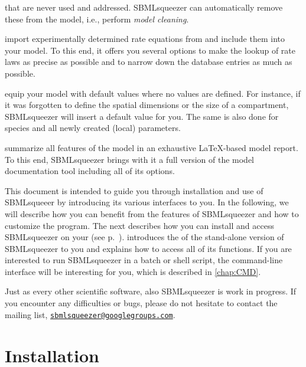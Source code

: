 \begin{dinglist}{52}
  that are never used and addressed. SBMLsqueezer can automatically remove these from
  the model, i.e., perform \emph{model cleaning}.
\item import experimentally determined rate equations from \SABIO and include them into
  your model. To this end, it offers you several options to make the lookup of rate laws
  as precise as possible and to narrow down the database entries as much as possible.
\item equip your model with default values where no values are defined. For instance,
  if it was forgotten to define the spatial dimensions or the size of a compartment,
  SBMLsqueezer will insert a default value for you. The same is also done for species
  and all newly created (local) parameters.
\item summarize all features of the model in an exhaustive \LaTeX-based model report.
  To this end, SBMLsqueezer brings with it a full version of the model documentation
  tool \SBMLLaTeX including all of its options.
\end{dinglist}

This document is intended to guide you through installation and use of SBMLsqueeer by introducing its various interfaces to you.
In the following, we will describe how you can benefit from the features of SBMLsqueezer
and how to customize the program.
The next 
describes how you can install and access SBMLsqueezer on your \OS (see p.~).
 introduces the \GUI of the stand-alone
version of SBMLsqueezer to you and explains how to access all of its functions.
If you are interested to run SBMLsqueezer in a batch or shell script, the
command-line interface will be interesting for you, which is described in
\vref{chap:CMD}.

Just as every other scientific software, also SBMLsqueezer is work in progress.
If you encounter any difficulties or bugs, please do not hesitate to contact
the mailing list, 
\href{mailto:sbmlsqueezer@googlegroups.com}{\texttt{sbmlsqueezer@google\-groups.com}}.




\chapter{Installation}
\label{chap:Installation}

